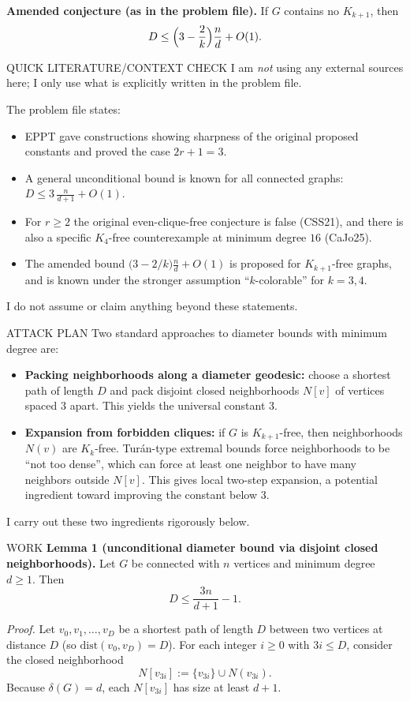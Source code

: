 \medskip
\noindent\textbf{Amended conjecture (as in the problem file).}
If $G$ contains no $K_{k+1}$, then
\[
D \le \Bigl(3-\frac{2}{k}\Bigr)\frac{n}{d} + O(1).
\]

QUICK LITERATURE/CONTEXT CHECK
I am \emph{not} using any external sources here; I only use what is explicitly
written in the problem file.

The problem file states:
\begin{itemize}
\item EPPT gave constructions showing sharpness of the original proposed
constants and proved the case $2r+1=3$.
\item A general unconditional bound is known for all connected graphs:
$D\le 3\,\frac{n}{d+1}+O(1)$.
\item For $r\ge2$ the original even-clique-free conjecture is false (CSS21), and
there is also a specific $K_4$-free counterexample at minimum degree $16$ (CaJo25).
\item The amended bound $\bigl(3-2/k\bigr)\frac{n}{d}+O(1)$ is proposed for
$K_{k+1}$-free graphs, and is known under the stronger assumption
``$k$-colorable'' for $k=3,4$.
\end{itemize}
I do not assume or claim anything beyond these statements.

ATTACK PLAN
Two standard approaches to diameter bounds with minimum degree are:
\begin{itemize}
\item \textbf{Packing neighborhoods along a diameter geodesic:}
choose a shortest path of length $D$ and pack disjoint closed neighborhoods
$N[v]$ of vertices spaced $3$ apart. This yields the universal constant $3$.
\item \textbf{Expansion from forbidden cliques:}
if $G$ is $K_{k+1}$-free, then neighborhoods $N(v)$ are $K_k$-free.
Tur\'an-type extremal bounds force neighborhoods to be ``not too dense'', which
can force at least one neighbor to have many neighbors outside $N[v]$.
This gives local two-step expansion, a potential ingredient toward improving the
constant below $3$.
\end{itemize}
I carry out these two ingredients rigorously below.

WORK
\textbf{Lemma 1 (unconditional diameter bound via disjoint closed neighborhoods).}
Let $G$ be connected with $n$ vertices and minimum degree $d\ge1$.
Then
\[
D \le \frac{3n}{d+1}-1.
\]

\emph{Proof.}
Let $v_0,v_1,\dots,v_D$ be a shortest path of length $D$ between two vertices at
distance $D$ (so $\mathrm{dist}(v_0,v_D)=D$). For each integer $i\ge0$ with
$3i\le D$, consider the closed neighborhood
\[
N[v_{3i}] := \{v_{3i}\}\cup N(v_{3i}).
\]
Because $\delta(G)=d$, each $N[v_{3i}]$ has size at least $d+1$.

